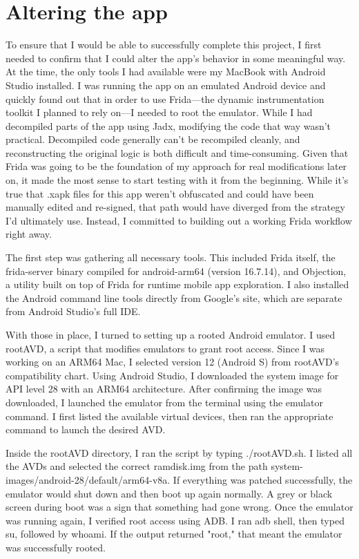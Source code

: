 \section{Altering the app}
To ensure that I would be able to successfully complete this project, I first needed to confirm that I could alter the app’s behavior in some meaningful way. At the time, the only tools I had available were my MacBook with Android Studio installed. I was running the app on an emulated Android device and quickly found out that in order to use Frida—the dynamic instrumentation toolkit I planned to rely on—I needed to root the emulator. While I had decompiled parts of the app using Jadx, modifying the code that way wasn’t practical. Decompiled code generally can’t be recompiled cleanly, and reconstructing the original logic is both difficult and time-consuming.
Given that Frida was going to be the foundation of my approach for real modifications later on, it made the most sense to start testing with it from the beginning. While it’s true that .xapk files for this app weren’t obfuscated and could have been manually edited and re-signed, that path would have diverged from the strategy I’d ultimately use. Instead, I committed to building out a working Frida workflow right away.

The first step was gathering all necessary tools. This included Frida itself, the frida-server binary compiled for android-arm64 (version 16.7.14), and Objection, a utility built on top of Frida for runtime mobile app exploration. I also installed the Android command line tools directly from Google’s site, which are separate from Android Studio’s full IDE.

With those in place, I turned to setting up a rooted Android emulator. I used rootAVD, a script that modifies emulators to grant root access. Since I was working on an ARM64 Mac, I selected version 12 (Android S) from rootAVD’s compatibility chart. Using Android Studio, I downloaded the system image for API level 28 with an ARM64 architecture. After confirming the image was downloaded, I launched the emulator from the terminal using the emulator command. I first listed the available virtual devices, then ran the appropriate command to launch the desired AVD.

Inside the rootAVD directory, I ran the script by typing ./rootAVD.sh. I listed all the AVDs and selected the correct ramdisk.img from the path system-images/android-28/default/arm64-v8a. If everything was patched successfully, the emulator would shut down and then boot up again normally. A grey or black screen during boot was a sign that something had gone wrong. Once the emulator was running again, I verified root access using ADB. I ran adb shell, then typed su, followed by whoami. If the output returned "root," that meant the emulator was successfully rooted.

